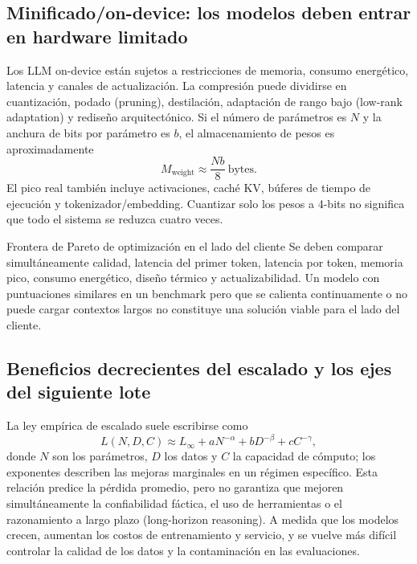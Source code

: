\subsection{Minificado/on-device: los modelos deben entrar en hardware limitado}

Los LLM on-device están sujetos a restricciones de memoria, consumo energético, latencia y canales de actualización. La compresión puede dividirse en cuantización, podado (pruning), destilación, adaptación de rango bajo (low-rank adaptation) y rediseño arquitectónico. Si el número de parámetros es $N$ y la anchura de bits por parámetro es $b$, el almacenamiento de pesos es aproximadamente
\[
M_{\mathrm{weight}}\approx \frac{Nb}{8}\ \text{bytes}.
\]
El pico real también incluye activaciones, caché KV, búferes de tiempo de ejecución y tokenizador/embedding. Cuantizar solo los pesos a 4-bits no significa que todo el sistema se reduzca cuatro veces.


\begin{importantbox}{Frontera de Pareto de optimización en el lado del cliente}
Se deben comparar simultáneamente calidad, latencia del primer token, latencia por token, memoria pico, consumo energético, diseño térmico y actualizabilidad. Un modelo con puntuaciones similares en un benchmark pero que se calienta continuamente o no puede cargar contextos largos no constituye una solución viable para el lado del cliente.
\end{importantbox}

\subsection{Beneficios decrecientes del escalado y los ejes del siguiente lote}

La ley empírica de escalado suele escribirse como
\[
L(N,D,C)\approx L_{\infty}+aN^{-\alpha}+bD^{-\beta}+cC^{-\gamma},
\]
donde $N$ son los parámetros, $D$ los datos y $C$ la capacidad de cómputo; los exponentes describen las mejoras marginales en un régimen específico. Esta relación predice la pérdida promedio, pero no garantiza que mejoren simultáneamente la confiabilidad fáctica, el uso de herramientas o el razonamiento a largo plazo (long-horizon reasoning). A medida que los modelos crecen, aumentan los costos de entrenamiento y servicio, y se vuelve más difícil controlar la calidad de los datos y la contaminación en las evaluaciones.

